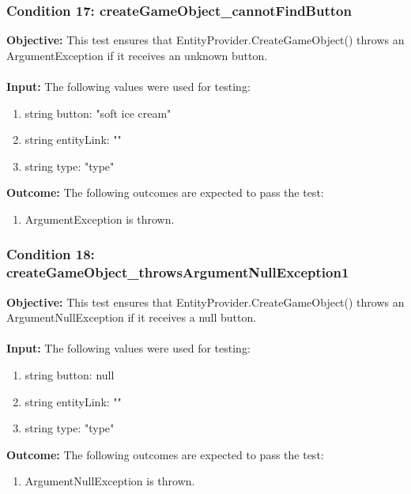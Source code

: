 \documentclass[a4paper,12pt]{article}
\begin{document}
		\subsubsection{Condition 17: createGameObject\_cannotFindButton}
			\textbf{Objective:} This test ensures that EntityProvider.CreateGameObject() throws an ArgumentException if it receives an unknown button.\\\\
			\textbf{Input:} The following values were used for testing:
				\begin{enumerate}
					\item string button: "soft ice cream"
					\item string entityLink: ""
					\item string type: "type"
				\end{enumerate}
			\textbf{Outcome:} The following outcomes are expected to pass the test:
				\begin{enumerate}
					\item ArgumentException is thrown.
				\end{enumerate}
		\subsubsection{Condition 18: createGameObject\_throwsArgumentNullException1}
			\textbf{Objective:} This test ensures that EntityProvider.CreateGameObject() throws an ArgumentNullException if it receives a null button.\\\\
			\textbf{Input:} The following values were used for testing:
				\begin{enumerate}
					\item string button: null
					\item string entityLink: ""
					\item string type: "type"
				\end{enumerate}
			\textbf{Outcome:} The following outcomes are expected to pass the test:
				\begin{enumerate}
					\item ArgumentNullException is thrown.
				\end{enumerate}
\end{document}

